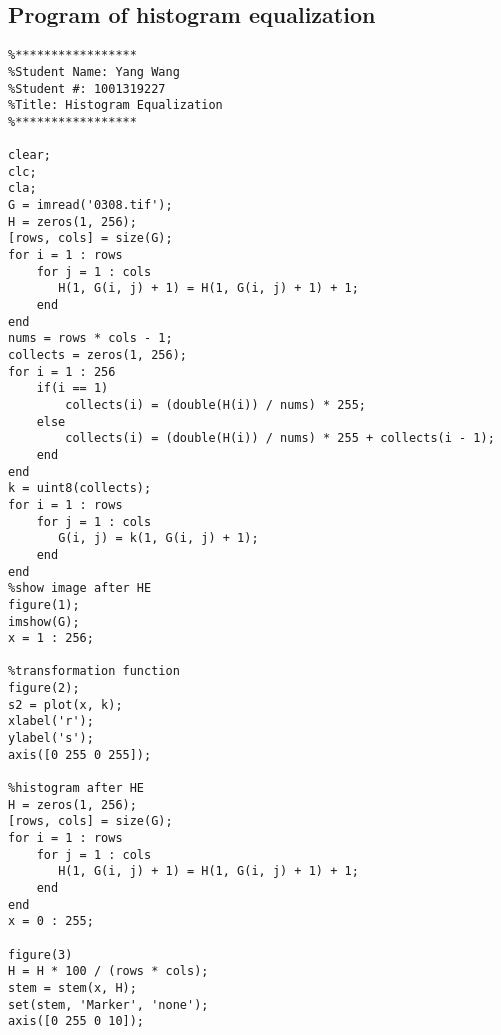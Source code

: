 \subsection{Program of histogram equalization}
\begin{lstlisting}
%*****************
%Student Name: Yang Wang
%Student #: 1001319227
%Title: Histogram Equalization
%*****************

clear;
clc;
cla;
G = imread('0308.tif');
H = zeros(1, 256);
[rows, cols] = size(G);
for i = 1 : rows
    for j = 1 : cols
       H(1, G(i, j) + 1) = H(1, G(i, j) + 1) + 1;
    end
end
nums = rows * cols - 1;
collects = zeros(1, 256);
for i = 1 : 256
    if(i == 1) 
        collects(i) = (double(H(i)) / nums) * 255;
    else
        collects(i) = (double(H(i)) / nums) * 255 + collects(i - 1);
    end
end
k = uint8(collects);
for i = 1 : rows
    for j = 1 : cols
       G(i, j) = k(1, G(i, j) + 1);
    end
end
%show image after HE
figure(1);
imshow(G);
x = 1 : 256;

%transformation function
figure(2);
s2 = plot(x, k);
xlabel('r');
ylabel('s');
axis([0 255 0 255]);

%histogram after HE
H = zeros(1, 256);
[rows, cols] = size(G);
for i = 1 : rows
    for j = 1 : cols
       H(1, G(i, j) + 1) = H(1, G(i, j) + 1) + 1;
    end
end
x = 0 : 255;

figure(3)
H = H * 100 / (rows * cols);
stem = stem(x, H);
set(stem, 'Marker', 'none');
axis([0 255 0 10]);
\end{lstlisting}